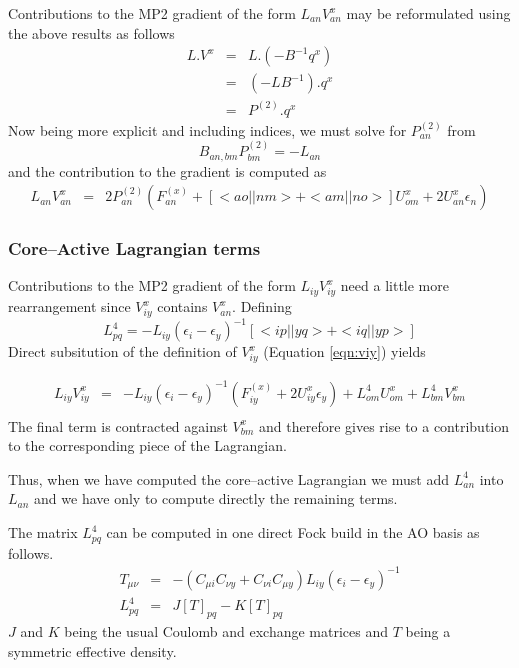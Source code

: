 \documentclass[fleqn,12pt]{article}
\newcommand{\bra}{<\!}
\newcommand{\ket}{\!>}
\newcommand{\Ptwo}{P^{(2)}}
\newcommand{\Fx}{F^{(x)}}
\begin{document}
Contributions to the MP2 gradient of the form $L_{an}V^x_{an}$ may be
reformulated using the above results as follows
\begin{eqnarray}
  L . V^x & = & L.\left( -B^{-1}q^x \right) \\
  & = & \left( -L B^{-1} \right). q^x \\
  & = & \Ptwo . q^x
\end{eqnarray}
Now being more explicit and including indices, we must solve for
$\Ptwo_{an}$ from
\begin{equation}
\label{eqn:ptwoan} 
  B_{an,bm} \Ptwo_{bm} = -L_{an}
\end{equation}
and the contribution to the gradient is computed as
\begin{eqnarray}
  L_{an}V^x_{an} & = &  2 \Ptwo_{an} \left(
    \Fx_{an} + \left[ \bra ao||nm \ket
      + \bra am||no \ket \right] U^x_{om} + 2 U^x_{an} \epsilon_n
  \right) 
\end{eqnarray}

\subsubsection{Core--Active Lagrangian terms}
\label{sec:calag}

Contributions to the MP2 gradient of the form $L_{iy}V^x_{iy}$ 
need a little more rearrangement since $V^x_{iy}$ contains 
$V^x_{an}$.  
Defining
\begin{equation}
\label{eqn:l4}
  L^4_{pq} = - L_{iy} \left( \epsilon_i -  \epsilon_y
  \right)^{-1} \left[ \bra ip||yq \ket + \bra iq||yp \ket \right]
\end{equation}
Direct subsitution of the definition of $V^x_{iy}$ (Equation 
\ref{eqn:viy}) yields

\begin{eqnarray}
\label{eqn:xxx}
  L_{iy} V^x_{iy} & = & - L_{iy} \left( \epsilon_i -  \epsilon_y  \right)^{-1} 
     \left(\Fx_{iy} + 2 U^x_{iy}  \epsilon_y \right)
    + L^4_{om} U^x_{om} + L^4_{bm}V^x_{bm}\\
\end{eqnarray}
The final term is contracted against $V^x_{bm}$ and therefore gives
rise to a contribution to the corresponding piece of the Lagrangian.

Thus, when we have computed the core--active Lagrangian we must add
$L^4_{an}$ into $L_{an}$ and we have only to compute directly the
remaining terms.

The matrix $L^4_{pq}$ can be computed in one direct Fock build in
the AO basis as follows.
\begin{eqnarray}
  T_{\mu \nu} & = & - \left(C_{\mu i} C_{\nu y} + C_{\nu i} C_{\mu y}
  \right) L_{iy} \left( \epsilon_i - \epsilon_y \right)^{-1} \\
  L^4_{pq} & = & J[T]_{pq} - K[T]_{pq}
\end{eqnarray}
$J$ and $K$ being the usual Coulomb and exchange matrices and $T$
being a symmetric effective density.
\end{document}
